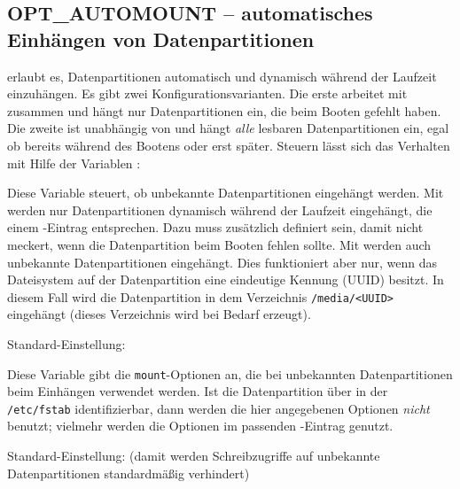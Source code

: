 \subsection {OPT\_AUTOMOUNT -- automatisches Einhängen von Datenpartitionen}

     erlaubt es, Datenpartitionen automatisch und
    dynamisch während der Laufzeit einzuhängen. Es gibt zwei
    Konfigurationsvarianten. Die erste arbeitet mit 
    zusammen und hängt nur Datenpartitionen ein, die beim Booten gefehlt haben.
    Die zweite ist unabhängig von  und hängt \emph{alle}
    lesbaren Datenpartitionen ein, egal ob bereits während des Bootens oder
    erst später. Steuern lässt sich das Verhalten mit Hilfe der Variablen
    :

\begin{description}

    Diese Variable steuert, ob unbekannte Datenpartitionen eingehängt werden.
    Mit  werden nur Datenpartitionen dynamisch
    während der Laufzeit eingehängt, die einem -Eintrag
    entsprechen. Dazu muss zusätzlich 
    definiert sein, damit  nicht meckert, wenn die
    Datenpartition beim Booten fehlen sollte. Mit 
    werden auch unbekannte Datenpartitionen eingehängt. Dies funktioniert aber
    nur, wenn das Dateisystem auf der Datenpartition eine eindeutige Kennung
    (UUID) besitzt. In diesem Fall wird die Datenpartition in dem Verzeichnis
    \texttt{/media/<UUID>} eingehängt (dieses Verzeichnis wird bei Bedarf
    erzeugt).

    Standard-Einstellung: 


    Diese Variable gibt die \texttt{mount}-Optionen an, die bei unbekannten
    Datenpartitionen beim Einhängen verwendet werden. Ist die Datenpartition
    über  in der \texttt{/etc/fstab} identifizierbar, dann
    werden die hier angegebenen Optionen \emph{nicht} benutzt; vielmehr werden
    die Optionen im passenden -Eintrag genutzt.

    Standard-Einstellung:  (damit werden
    Schreibzugriffe auf unbekannte Datenpartitionen standardmäßig verhindert)

\end{description}

